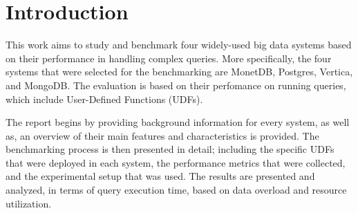 \section{Introduction}
\label{sec:intro}


This work aims to study and benchmark four widely-used 
big data systems based on their performance in handling
complex queries. More specifically, the four systems
that were selected for the benchmarking are MonetDB, 
Postgres, Vertica, and MongoDB. The evaluation is 
based on their perfomance on running queries, which
include User-Defined Functions (UDFs).

The report begins by providing background information 
for every system, as well as, an overview 
of their main features and characteristics is provided.
The benchmarking process is then presented in detail; 
including the specific UDFs that were deployed in each system, 
the performance metrics that were collected, 
and the experimental setup that was used. 
The results are presented and analyzed, 
in terms of query execution time, 
based on data overload and resource utilization. 

